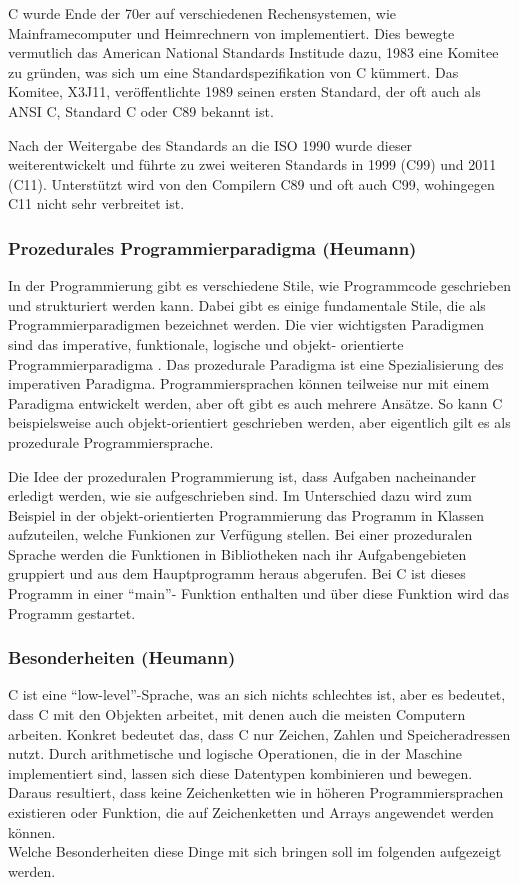   C wurde Ende der 70er auf verschiedenen Rechensystemen, wie Mainframecomputer und
  Heimrechnern von implementiert. Dies bewegte vermutlich das American National Standards
  Institude dazu, 1983 eine Komitee zu gründen, was sich um eine Standardspezifikation von
  C kümmert. Das Komitee, X3J11, veröffentlichte 1989 seinen ersten Standard, der oft auch
  als ANSI C, Standard C oder C89 bekannt ist.
  
  Nach der Weitergabe des Standards an die \ac{ISO} 1990 wurde dieser weiterentwickelt und
  führte zu zwei weiteren Standards in 1999 (C99) und 2011 (C11). Unterstützt wird von den
  Compilern C89 und oft auch C99, wohingegen C11 nicht sehr verbreitet ist. \nocite{ritchie93}
 
 \subsubsection{Prozedurales Programmierparadigma (Heumann)}
  In der Programmierung gibt es verschiedene Stile, wie Programmcode geschrieben und strukturiert
  werden kann. Dabei gibt es einige fundamentale Stile, die als Programmierparadigmen bezeichnet
  werden. Die vier wichtigsten Paradigmen sind das imperative, funktionale, logische und objekt-
  orientierte Programmierparadigma \cite{normark03}. Das prozedurale Paradigma ist eine Spezialisierung des 
  imperativen Paradigma. Programmiersprachen können teilweise nur mit einem Paradigma entwickelt
  werden, aber oft gibt es auch mehrere Ansätze. So kann C beispielsweise auch objekt-orientiert
  geschrieben werden, aber eigentlich gilt es als prozedurale Programmiersprache.
  
  Die Idee der prozeduralen Programmierung ist, dass Aufgaben nacheinander erledigt werden, wie
  sie aufgeschrieben sind. Im Unterschied dazu wird zum Beispiel in der objekt-orientierten
  Programmierung das Programm in Klassen aufzuteilen, welche Funkionen zur Verfügung stellen. Bei
  einer prozeduralen Sprache werden die Funktionen in Bibliotheken nach ihr Aufgabengebieten
  gruppiert und aus dem Hauptprogramm heraus abgerufen. Bei C ist dieses Programm in einer ``main''-
  Funktion enthalten und über diese Funktion wird das Programm gestartet.

 \subsubsection{Besonderheiten (Heumann)}
 C ist eine ``low-level''-Sprache, was an sich nichts schlechtes ist, aber es bedeutet, dass C mit den
 Objekten arbeitet, mit denen auch die meisten Computern arbeiten. Konkret bedeutet das, dass
 C nur Zeichen, Zahlen und Speicheradressen nutzt. Durch arithmetische und logische Operationen,
 die in der Maschine implementiert sind, lassen sich diese Datentypen kombinieren und bewegen.
 Daraus resultiert, dass keine Zeichenketten wie in höheren Programmiersprachen existieren oder
 Funktion, die auf Zeichenketten und Arrays angewendet werden können. \cite{kernighan88} \\
 Welche Besonderheiten diese Dinge mit sich bringen soll im folgenden aufgezeigt werden.

